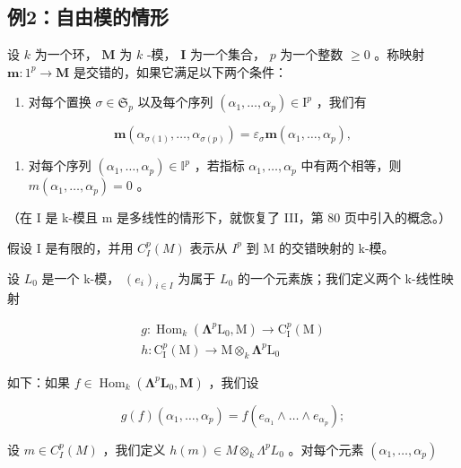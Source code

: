 \subsection{例2：自由模的情形}

设 \(k\) 为一个环， \(\mathbf{M}\) 为 \(k\) -模， \(\mathbf{I}\) 为一个集合， \(p\) 为一个整数 \(\geqslant 0\) 。称映射 \(\boldsymbol{m}:1^{p}\to\mathbf{M}\) 是交错的，如果它满足以下两个条件：

\begin{enumerate}
\def\labelenumi{\alph{enumi})}
\tightlist
\item
  对每个置换 \(\sigma \in \mathfrak{S}_p\) 以及每个序列 \((\alpha_1, \ldots, \alpha_p) \in \mathrm{I}^p\) ，我们有
\end{enumerate}

\[
\boldsymbol {m} \left(\alpha_ {\sigma (1)}, \dots , \alpha_ {\sigma (p)}\right) = \varepsilon_ {\sigma} \boldsymbol {m} \left(\alpha_ {1}, \dots , \alpha_ {p}\right),
\]

\begin{enumerate}
\def\labelenumi{\alph{enumi})}
\setcounter{enumi}{1}
\tightlist
\item
  对每个序列 \((\alpha_{1},\ldots,\alpha_{p})\in\mathbb{I}^{p}\) ，若指标 \(\alpha_{1},\ldots,\alpha_{p}\) 中有两个相等，则 \(m(\alpha_{1},\ldots,\alpha_{p})=0\) 。
\end{enumerate}

（在 I 是 k-模且 m 是多线性的情形下，就恢复了 III，第 80 页中引入的概念。）

假设 I 是有限的，并用 \(C_{I}^{p}(M)\) 表示从 \(I^{p}\) 到 M 的交错映射的 k-模。

设 \(L_{0}\) 是一个 k-模， \((e_{i})_{i\in I}\) 为属于 \(L_{0}\) 的一个元素族；我们定义两个 k-线性映射

\[
\begin{array}{l} g: \operatorname{Hom} _ {k} (\symbf {\Lambda} ^ {p} \mathrm{L} _ {0}, \mathrm{M}) \to \mathrm{C} _ {\mathrm{I}} ^ {p} (\mathrm{M}) \\ h: \mathrm{C} _ {\mathrm{I}} ^ {p} (\mathrm{M}) \to \mathrm{M} \otimes_ {k} \symbf {\Lambda} ^ {p} \mathrm{L} _ {0} \end{array}
\]

如下：如果 \(f \in \operatorname{Hom}_k(\symbf{\Lambda}^p \mathbf{L}_0, \mathbf{M})\) ，我们设

\[
g (f) (\alpha_ {1}, \dots , \alpha_ {p}) = f (e _ {\alpha_ {1}} \wedge \dots \wedge e _ {\alpha_ {p}});
\]

设 \(m \in C_{I}^{p}(M)\) ，我们定义 \(h(m) \in M \otimes_{k} \Lambda^{p} L_{0}\) 。对每个元素 \((\alpha_{1}, \ldots, \alpha_{p})\)

